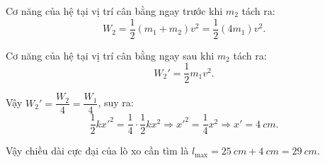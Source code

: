 \begin{enumerate}[label=\bfseries Câu \arabic*:]
{		Cơ năng của hệ tại vị trí cân bằng ngay trước khi $m_2$ tách ra:
		$$W_2 = \dfrac{1}{2} (m_1+m_2)v^2 = \dfrac{1}{2} (4m_1) v^2.$$
		
		Cơ năng của hệ tại vị trí cân bằng ngay sau khi $m_2$ tách ra:
		$$W_2' = \dfrac{1}{2}m_1v^2.$$
		
		Vậy $W_2'= \dfrac{W_2}{4} = \dfrac{W_1}{4}$, suy ra:
		$$\dfrac{1}{2}k x'^2 = \dfrac{1}{4} \cdot \dfrac{1}{2}kx^2 \Rightarrow x'^2 = \dfrac{1}{4}x^2 \Rightarrow x'=\SI{4}{cm}.$$
		
		Vậy chiều dài cực đại của lò xo cần tìm là $l_\text{max} = \SI{25}{cm} + \SI{4}{cm} = \SI{29}{cm}$.
	}
	
\end{enumerate}
